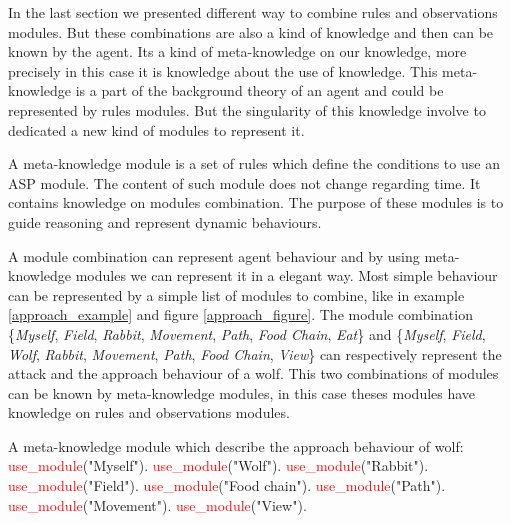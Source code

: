 \documentclass{aamas2012}
\begin{document}
	In the last section we presented different way to combine rules and observations modules.
	But these combinations are also a kind of knowledge and then can be known by the agent.
	Its a kind of meta-knowledge on our knowledge, more precisely in this case it is knowledge about the use of knowledge.
	This meta-knowledge is a part of the background theory of an agent and could be represented by rules modules.
	But the singularity of this knowledge involve to dedicated a new kind of modules to represent it.

	\begin{definition}
		A meta-knowledge module is a set of rules which define the conditions to use an ASP module.
		The content of such module does not change regarding time.
		It contains knowledge on modules combination.	
		The purpose of these modules is to guide reasoning and represent dynamic behaviours.
	\end{definition}
	
	A module combination can represent agent behaviour and by using meta-knowledge modules we can represent it in a elegant way.
	Most simple behaviour can be represented by a simple list of modules to combine, like in example \ref{approach_example} and figure \ref{approach_figure}.
	The module combination \{\emph{Myself}, \emph{Field}, \emph{Rabbit}, \emph{Movement}, \emph{Path}, \emph{Food Chain}, \emph{Eat}\} 
	and \{\emph{Myself}, \emph{Field}, \emph{Wolf}, \emph{Rabbit}, \emph{Movement}, \emph{Path}, \emph{Food Chain}, \emph{View}\} 
	can respectively represent the attack and the approach behaviour of a wolf.
	This two combinations of modules can be known by meta-knowledge modules, in this case theses modules have knowledge on rules and observations modules.
	
	\begin{example}
		\label{approach_example}
		A meta-knowledge module which describe the approach behaviour of wolf:\newline
		\newline
		\textcolor{red}{use\_module}("Myself").\newline
		\textcolor{red}{use\_module}("Wolf").\newline
		\textcolor{red}{use\_module}("Rabbit").\newline
		\textcolor{red}{use\_module}("Field").\newline
		\textcolor{red}{use\_module}("Food chain").\newline
		\textcolor{red}{use\_module}("Path").\newline
		\textcolor{red}{use\_module}("Movement").\newline
		\textcolor{red}{use\_module}("View").
	\end{example}
	
\end{document}
